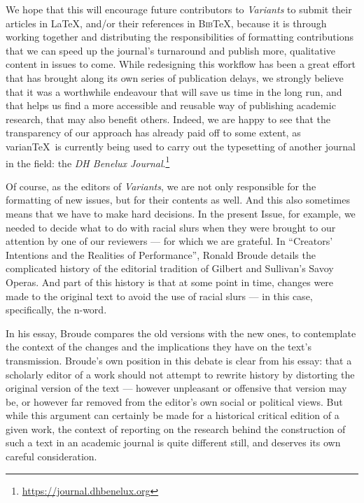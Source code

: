 \begin{preface}
We hope that this will encourage future contributors to \emph{Variants} to submit their articles in \LaTeX, and/or their references in \textsc{Bib}\negthinspace\TeX, because it is through working together and distributing the responsibilities of formatting contributions that we can speed up the journal's turnaround and publish more, qualitative content in issues to come. 
While redesigning this workflow has been a great effort that has brought along its own series of publication delays, we strongly believe that it was a worthwhile endeavour that will save us time in the long run, and that helps us find a more accessible and reusable way of publishing academic research, that may also benefit others. 
Indeed, we are happy to see that the transparency of our approach has already paid off to some extent, as varian\TeX ~is currently being used to carry out the typesetting of another journal in the field: the \emph{DH Benelux Journal}.\footnote{\url{https://journal.dhbenelux.org}}

\label{nword:preface:start}Of course, as the editors of \emph{Variants}, we are not only responsible for the formatting of new issues, but for their contents as well. 
And this also sometimes means that we have to make hard decisions. 
In the present Issue, for example, we needed to decide what to do with racial slurs when they were brought to our attention by one of our reviewers --- for which we are grateful.
In ``Creators' Intentions and the Realities of Performance'', Ronald Broude details the complicated history of the editorial tradition of Gilbert and Sullivan's Savoy Operas.
And part of this history is that at some point in time, changes were made to the original text to avoid the use of racial slurs --- in this case, specifically, the n-word. 

In his essay, Broude compares the old versions with the new ones, to contemplate the context of the changes and the implications they have on the text's transmission. 
Broude's own position in this debate is clear from his essay: that a scholarly editor of a work should not attempt to rewrite history by distorting the original version of the text --- however unpleasant or offensive that version may be, or however far removed from the editor's own social or political views. 
But while this argument can certainly be made for a historical critical edition of a given work, the context of reporting on the research behind the construction of such a text in an academic journal is quite different still, and deserves its own careful consideration.


\end{preface}

